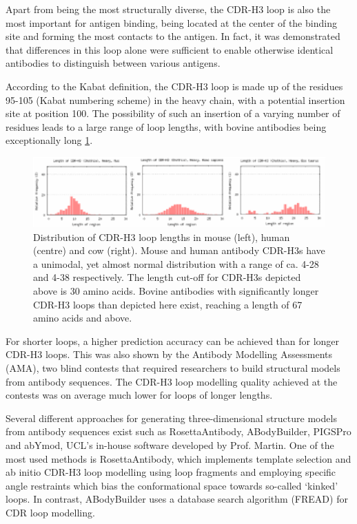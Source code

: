 \documentclass[12pt]{article}
\begin{document}
Apart from being the most structurally diverse, the CDR-H3 loop is also
the most important for antigen binding, being located at the center of
the binding site and forming the most contacts to the antigen\cite{MacCallum1996}. In fact, it was demonstrated that differences in
this loop alone were sufficient to enable otherwise identical
antibodies to distinguish between various antigens\cite{Xu2000}.

According to the Kabat definition, the CDR-H3 loop is made up of the
residues 95-105 (Kabat numbering scheme\cite{Kabat1992}) in the heavy
chain, with a potential insertion site at position 100. The
possibility of such an insertion of a varying number of residues leads
to a large range of loop lengths, with bovine antibodies being
exceptionally long \ref{fig:loopdist}.

\begin{figure}
  \includegraphics[scale=1]{loopdist.eps}
  \centering
  \caption { Distribution of CDR-H3 loop lengths in mouse (left),
    human (centre) and cow (right). Mouse and human antibody CDR-H3s
    have a unimodal, yet almost normal distribution with a range of
    ca. 4-28 and 4-38 respectively. The length cut-off for CDR-H3s
    depicted above is 30 amino acids. Bovine antibodies with
    significantly longer CDR-H3 loops than depicted here exist,
    reaching a length of 67 amino acids and
    above\protect\cite{Wong2015}.}  
  \label{fig:loopdist}
\end{figure}

For shorter loops, a higher prediction accuracy can be achieved than
for longer CDR-H3 loops. This was also shown by the Antibody Modelling
Assessments (AMA), two blind contests that required researchers to
build structural models from antibody sequences. The CDR-H3 loop
modelling quality achieved at the contests was on average much lower
for loops of longer lengths\cite{Almagro2011,Almagro2014}.

Several different approaches for generating three-dimensional
structure models from antibody sequences exist such as RosettaAntibody\cite{Sircar2009,Sivasubramanian2009},
ABodyBuilder\cite{Leem2016}, PIGSPro\cite{Lepore2017} and abYmod,
UCL's in-house software developed by Prof. Martin. One of the most
used methods is RosettaAntibody, which implements template selection
and ab initio CDR-H3 loop modelling using loop fragments and employing
specific angle restraints which bias the conformational space towards
so-called `kinked' loops\cite{Schoeder2021,Weitzner2017}. In
contrast, ABodyBuilder uses a database search algorithm
(FREAD\cite{Choi2010}) for CDR loop modelling.
\end{document}
